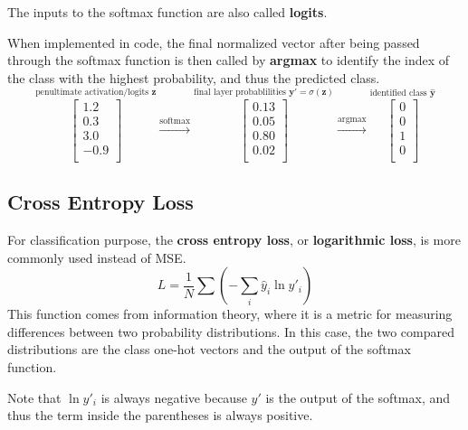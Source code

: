 \documentclass[12pt]{report}
\theoremstyle{definition}
\theoremstyle{remark}
\begin{document}
The inputs to the softmax function are also called \textbf{logits}.

When implemented in code, the final normalized vector after being passed through the softmax function is then called by \textbf{argmax} to identify the index of the class with the highest probability, and thus the predicted class.
\begin{equation}
    \stackrel{\mbox{penultimate activation/logits $\mathbf{z}$}}{\begin{bmatrix}
        1.2 \\
        0.3 \\
        3.0 \\
        -0.9 \\
    \end{bmatrix}}
    \xrightarrow{\text{softmax}}
    \stackrel{\mbox{final layer probablilities $\mathbf{y'} = \sigma({\mathbf{z}})$}}{\begin{bmatrix}
        0.13 \\
        0.05 \\
        0.80 \\
        0.02 \\
    \end{bmatrix}}
    \xrightarrow{\text{argmax}}
    \stackrel{\mbox{identified class $\mathbf{\hat{y}}$}}{\begin{bmatrix}
        0 \\
        0 \\
        1 \\
        0 \\
    \end{bmatrix}}
\end{equation}

\subsection{Cross Entropy Loss}

For classification purpose, the \textbf{cross entropy loss}, or \textbf{logarithmic loss}, is more commonly used instead of MSE\@.
\begin{equation}
L = \frac{1}{N}\sum \left(-\sum_i \hat{y}_i \ln y'_i\right)
\end{equation}
This function comes from information theory, where it is a metric for measuring differences between two probability distributions. In this case, the two compared distributions are the class one-hot vectors and the output of the softmax function.

Note that $\ln y'_i$ is always negative because $y'$ is the output of the softmax, and thus the term inside the parentheses is always positive.
\end{document}
